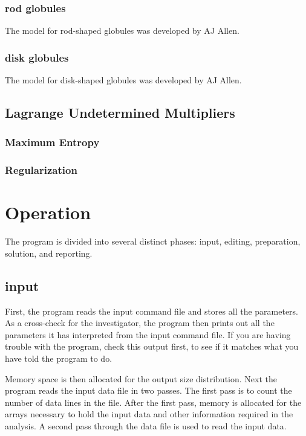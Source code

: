 \documentclass[letterpaper]{article}
\begin{document}
\subsubsection{rod globules}

The model for rod-shaped globules was developed by AJ Allen.

\subsubsection{disk globules}

The model for disk-shaped globules was developed by AJ Allen.

\subsection{Lagrange Undetermined Multipliers}

\subsubsection{Maximum Entropy}

\subsubsection{Regularization}

\section{Operation}

The program is divided into several distinct phases: 
input, editing, preparation, solution, and reporting.

\subsection{input}

First, the program reads the input command file and 
stores all the parameters.  As a cross-check for the 
investigator, the program then prints out all the 
parameters it has interpreted from the input command 
file.  If you are having trouble with the program, 
check this output first, to see if it matches what 
you have told the program to do.

Memory space is then 
allocated for the output size distribution.
Next the program reads 
the input data file in two passes.  The first pass is 
to count the number of data lines in the file.  After 
the first pass, memory is allocated for the arrays 
necessary to hold the input data and other information
required in the analysis.  A second pass through the 
data file is used to read the input data.
\end{document}
